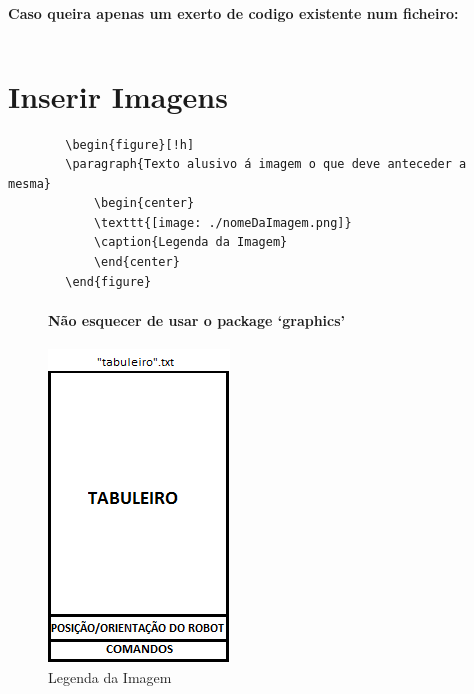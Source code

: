 \documentclass[a4paper,11pt]{article}%
\begin{document}
\paragraph{\ \ }\textbf{Caso queira apenas um exerto de codigo existente num ficheiro:}
\begin{verbatim}

\end{verbatim}


\newpage
\section{Inserir Imagens}
\begin{verbatim}
        \begin{figure}[!h]
		\paragraph{Texto alusivo á imagem o que deve anteceder a mesma}
        	\begin{center}
            \texttt{[image: ./nomeDaImagem.png]}
            \caption{Legenda da Imagem}
            \end{center}
        \end{figure}
\end{verbatim}



\begin{figure}[!h]
\paragraph{\textbf{Não esquecer de usar o package `graphics'}}
    \begin{center}
    \includegraphics[scale=0.6]{./imagemdeteste.png}
    \caption{Legenda da Imagem}
    \end{center}
\end{figure}
\end{document}
